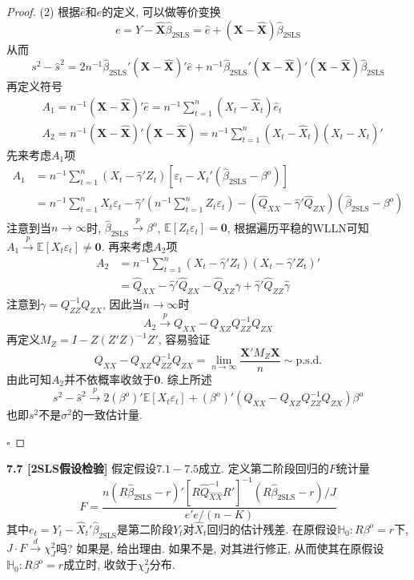 \documentclass[cn,12pt,math=mtpro2,citestyle=gb7714-2015,bibstyle=gb7714-2015,twocol,mode=simple]{elegantbook}
\newcommand{\HH}{\mathbb{H}}
\newcommand{\E}{\mathbb{E}}
\newcommand{\btls}{\hat{\beta}_{\text{2SLS}}}
\begin{document}
\begin{proof}
  (2) 根据$\hat{e}$和$e$的定义, 可以做等价变换
  $$e=Y-\hat{\mathbf{X}}\btls=\hat{e}+(\mathbf{X}-\hat{\mathbf{X}})\btls$$
  从而
  $$s^2-\hat{s}^2=2n^{-1}\btls'(\mathbf{X}-\hat{\mathbf{X}})'\hat{e}+n^{-1}\btls'(\mathbf{X}-\hat{\mathbf{X}})'(\mathbf{X}-\hat{\mathbf{X}})\btls$$
  再定义符号
  \begin{align*}
  & A_1=n^{-1}(\mathbf{X}-\hat{\mathbf{X}})'\hat{e}=n^{-1}\sum_{t=1}^{n}(X_t-\hat{X}_t)\hat{e}_t \\
  & A_2=n^{-1}(\mathbf{X}-\hat{\mathbf{X}})'(\mathbf{X}-\hat{\mathbf{X}})=n^{-1}\sum_{t=1}^{n}(X_t-\hat{X}_t)(X_t-\hat{X}_t)'
  \end{align*}
  先来考虑$A_1$项
  \begin{align*}
  A_1&=n^{-1}\sum_{t=1}^{n}(X_t-\hat{\gamma}'Z_t)[\varepsilon_t-X_t'(\btls-\beta^o)] \\
  &=n^{-1}\sum_{t=1}^{n}X_t\varepsilon_t-\hat{\gamma}'\left(n^{-1}\sum_{t=1}^{n}Z_t\varepsilon_t\right)-(\hat{Q}_{XX}-\hat{\gamma}'\hat{Q}_{ZX})(\btls-\beta^o)
  \end{align*}
  注意到当$n\to\infty$时, $\btls\xrightarrow{p}\beta^o$, $\E[Z_t\varepsilon_t]=\mathbf{0}$, 根据遍历平稳的WLLN可知$A_1\xrightarrow{p}\E[X_t\varepsilon_t]\neq\mathbf{0}$. 再来考虑$A_2$项
  \begin{align*}
  A_2&=n^{-1}\sum_{t=1}^{n}(X_t-\hat{\gamma}'Z_t)(X_t-\hat{\gamma}'Z_t)' \\
  &=\hat{Q}_{XX}-\hat{\gamma}'\hat{Q}_{ZX}-\hat{Q}_{XZ}\hat{\gamma}+\hat{\gamma}'\hat{Q}_{ZZ}\hat{\gamma}
  \end{align*}
  注意到$\gamma=Q_{ZZ}^{-1}Q_{ZX}$, 因此当$n\to\infty$时
  $$A_2\xrightarrow{p}Q_{XX}-Q_{XZ}Q_{ZZ}^{-1}Q_{ZX}$$
  再定义$M_Z=I-Z(Z'Z)^{-1}Z'$, 容易验证
  $$Q_{XX}-Q_{XZ}Q_{ZZ}^{-1}Q_{ZX}=\lim_{n\to\infty}\frac{\mathbf{X}'M_Z\mathbf{X}}{n}\sim \text{p.s.d.}$$
  由此可知$A_2$并不依概率收敛于$\mathbf{0}$. 综上所述
  $$s^2-\hat{s}^2\xrightarrow{p}2(\beta^o){'}\E[X_t\varepsilon_t]+(\beta^o){'}(Q_{XX}-Q_{XZ}Q_{ZZ}^{-1}Q_{ZX})\beta^o$$
  也即$s^2$不是$\sigma^2$的一致估计量.

  $\square$
\end{proof}

\textbf{7.7 [2SLS假设检验]} 假定假设$7.1-7.5$成立. 定义第二阶段回归的$F$统计量
$$F=\frac{n(R\btls-r)'[R\hat{Q}_{\hat{X}\hat{X}}^{-1}R']^{-1}(R\btls-r)/J}{e'e/(n-K)}$$
其中$e_t=Y_t-\hat{X}_t'\btls$是第二阶段$Y_t$对$\hat{X}_t$回归的估计残差. 在原假设$\HH_0: R\beta^o=r$下, $J\cdot F\xrightarrow{d}\chi_J^2$吗? 如果是, 给出理由. 如果不是, 对其进行修正, 从而使其在原假设$\HH_0: R\beta^o=r$成立时, 收敛于$\chi_J^2$分布.
\end{document}
